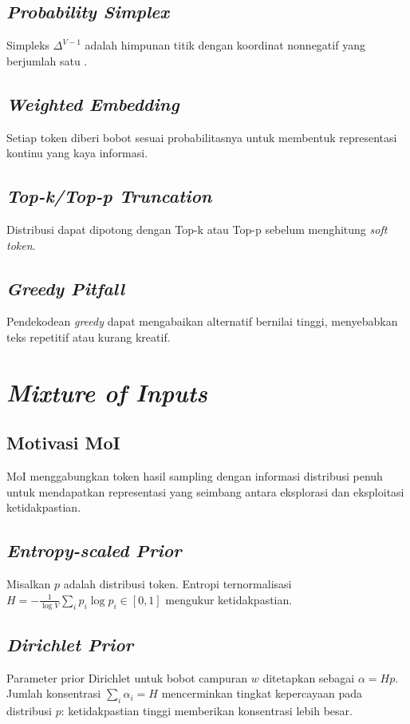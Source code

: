 \subsection{\textit{Probability Simplex}}
Simpleks \(\Delta^{V-1}\) adalah himpunan titik dengan koordinat nonnegatif yang berjumlah satu \citep{softthinking}.

\subsection{\textit{Weighted Embedding}}
Setiap token diberi bobot sesuai probabilitasnya untuk membentuk representasi kontinu yang kaya informasi.

\subsection{\textit{Top-k/Top-p Truncation}}
Distribusi dapat dipotong dengan Top-k atau Top-p sebelum menghitung \textit{soft token}.

\subsection{\textit{Greedy Pitfall}}
Pendekodean \textit{greedy} dapat mengabaikan alternatif bernilai tinggi, menyebabkan teks repetitif atau kurang kreatif.

\section{\textit{Mixture of Inputs}}

\subsection{Motivasi MoI}
MoI menggabungkan token hasil sampling dengan informasi distribusi penuh untuk mendapatkan representasi yang seimbang antara eksplorasi dan eksploitasi ketidakpastian.

\subsection{\textit{Entropy-scaled Prior}}
Misalkan \(p\) adalah distribusi token. Entropi ternormalisasi \(H = -\frac{1}{\log V}\sum_i p_i \log p_i \in [0,1]\) mengukur ketidakpastian.

\subsection{\textit{Dirichlet Prior}}
Parameter prior Dirichlet untuk bobot campuran \(w\) ditetapkan sebagai \(\alpha = H p\). Jumlah konsentrasi \(\sum_i \alpha_i = H\) mencerminkan tingkat kepercayaan pada distribusi \(p\): ketidakpastian tinggi memberikan konsentrasi lebih besar.

